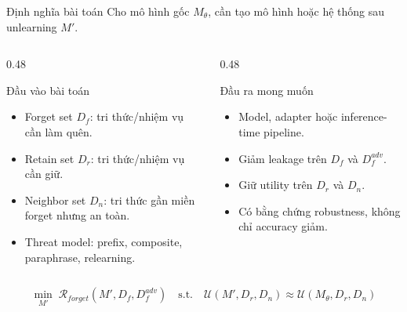 \documentclass[t, aspectratio=169]{beamer}
\begin{document}
\begin{frame}{Định nghĩa bài toán}
  \small
  Cho mô hình gốc $M_{\theta}$, cần tạo mô hình hoặc hệ thống sau unlearning $M'$.

  \vspace{0.4em}
  \begin{columns}[T]
    \begin{column}{0.48\textwidth}
      \begin{block}{Đầu vào bài toán}
        \begin{itemize}
          \item Forget set $D_f$: tri thức/nhiệm vụ cần làm quên.
          \item Retain set $D_r$: tri thức/nhiệm vụ cần giữ.
          \item Neighbor set $D_n$: tri thức gần miền forget nhưng an toàn.
          \item Threat model: prefix, composite, paraphrase, relearning.
        \end{itemize}
      \end{block}
    \end{column}
    \begin{column}{0.48\textwidth}
      \begin{block}{Đầu ra mong muốn}
        \begin{itemize}
          \item Model, adapter hoặc inference-time pipeline.
          \item Giảm leakage trên $D_f$ và $D_f^{adv}$.
          \item Giữ utility trên $D_r$ và $D_n$.
          \item Có bằng chứng robustness, không chỉ accuracy giảm.
        \end{itemize}
      \end{block}
    \end{column}
  \end{columns}

  \[
    \min_{M'} \; \mathcal{R}_{forget}(M',D_f,D_f^{adv})
    \quad \text{s.t.} \quad
    \mathcal{U}(M',D_r,D_n)\approx \mathcal{U}(M_{\theta},D_r,D_n)
  \]
\end{frame}
\end{document}
